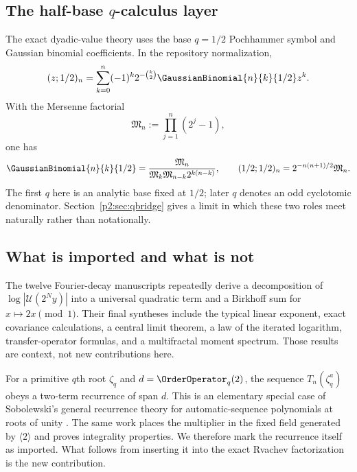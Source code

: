\documentclass[11pt,oneside]{article}
\theoremstyle{definition}
\theoremstyle{remark}
\begin{document}
\subsection{The half-base $q$-calculus layer}

The exact dyadic-value theory uses the base $q=1/2$ Pochhammer symbol and Gaussian
binomial coefficients. In the repository normalization,
\begin{equation}
 (z;1/2)_n=\sum_{k=0}^n(-1)^k2^{-\binom{k}{2}}
 \GaussianBinomial{n}{k}{1/2}z^k.
 \label{p2:eq:qbinom-expansion}
\end{equation}
With the Mersenne factorial
\begin{equation}
 \mathfrak M_n:=\prod_{j=1}^n(2^j-1),
 \label{p2:eq:Mersenne-factorial}
\end{equation}
one has
\begin{equation}
 \GaussianBinomial{n}{k}{1/2}
 =\frac{\mathfrak M_n}{\mathfrak M_k\mathfrak M_{n-k}2^{k(n-k)}},
 \qquad
 (1/2;1/2)_n=2^{-n(n+1)/2}\mathfrak M_n.
 \label{p2:eq:Mersenne-qbinom}
\end{equation}
The first $q$ here is an analytic base fixed at $1/2$; later $q$ denotes an odd
cyclotomic denominator. Section~\ref{p2:sec:qbridge} gives a limit in which these two
roles meet naturally rather than notationally.

\subsection{What is imported and what is not}

The twelve Fourier-decay manuscripts repeatedly derive a decomposition of
$\log|\mathscr U(2^Ny)|$ into a universal quadratic term and a Birkhoff sum for
$x\mapsto2x\pmod1$. Their final syntheses include the typical linear exponent,
exact covariance calculations, a central limit theorem, a law of the iterated
logarithm, transfer-operator formulas, and a multifractal moment spectrum. Those
results are context, not new contributions here.

For a primitive $q$th root $\zeta_q$ and $d=\OrderOperator_q(2)$, the sequence
$T_n(\zeta_q^a)$ obeys a two-term recurrence of span $d$. This is an elementary
special case of Sobolewski's general recurrence theory for automatic-sequence
polynomials at roots of unity \cite{p2:sobolewski2019}. The same work places the
multiplier in the fixed field generated by $\langle2\rangle$ and proves integrality
properties. We therefore mark the recurrence itself as imported. What follows from
inserting it into the exact Rvachev factorization is the new contribution.
\end{document}
